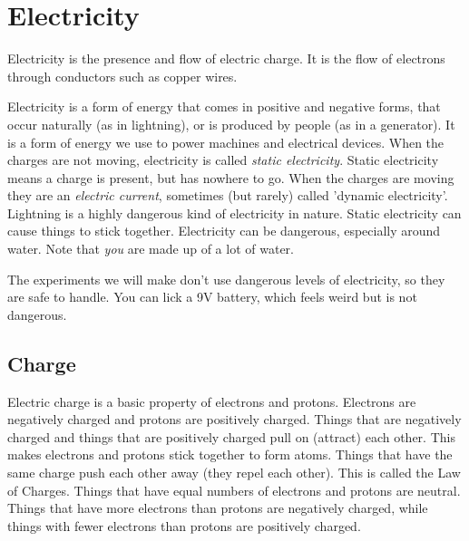 \section{Electricity}

Electricity is the presence and flow of electric charge. It is the flow of electrons through conductors such as copper wires.

Electricity is a form of energy that comes in positive and negative forms, that occur naturally (as in lightning), or is produced by people (as in a generator). It is a form of energy we use to power machines and electrical devices. When the charges are not moving, electricity is called \emph{static electricity}. Static electricity means a charge is present, but has nowhere to go. 
When the charges are moving they are an \emph{electric current}, sometimes (but rarely) called 'dynamic electricity'. Lightning is a highly dangerous kind of electricity in nature. Static electricity can cause things to stick together. Electricity can be dangerous, especially around water. Note that \emph{you} are made up of a lot of water. 

The experiments we will make don't use dangerous levels of electricity, so they are safe to handle. You can lick a 9V battery, which feels weird but is not dangerous. 

\bigskip


\subsection*{Charge}

Electric charge is a basic property of electrons and protons. Electrons are negatively charged and protons are positively charged. Things that are negatively charged and things that are positively charged pull on (attract) each other. This makes electrons and protons stick together to form atoms. Things that have the same charge push each other away (they repel each other). This is called the Law of Charges. Things that have equal numbers of electrons and protons are neutral. Things that have more electrons than protons are negatively charged, while things with fewer electrons than protons are positively charged. 



